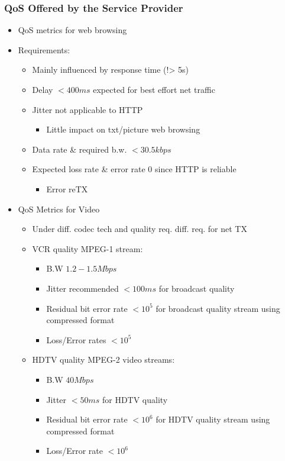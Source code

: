 \subsubsection{QoS Offered by the Service Provider}
\begin{itemize}
	\item QoS metrics for web browsing
	\item Requirements:
	\begin{itemize}
		\item Mainly influenced by response time (!> 5s)
		\item Delay $<400ms$ expected for best effort net traffic
		\item Jitter not applicable to HTTP
		\begin{itemize}
			\item Little impact on txt/picture web browsing
		\end{itemize}
		\item Data rate \& required b.w. $<30.5kbps$
		\item Expected loss rate \& error rate 0 since HTTP is
			reliable
		\begin{itemize}
			\item Error reTX
		\end{itemize}
	\end{itemize}
	\item QoS Metrics for Video
	\begin{itemize}
		\item Under diff. codec tech and quality req. diff. req. for net
			TX
		\item VCR quality MPEG-1 stream:
		\begin{itemize}
			\item B.W $1.2-1.5Mbps$
			\item Jitter recommended $<100ms$ for broadcast quality
			\item Residual bit error rate $<10^5$ for broadcast
				quality stream using compressed format
			\item Loss/Error rates $<10^5$
		\end{itemize}
		\item HDTV quality MPEG-2 video streams:
		\begin{itemize}
			\item B.W $40Mbps$
			\item Jitter $<50ms$ for HDTV quality
			\item Residual bit error rate $<10^6$ for HDTV quality
				stream using compressed format
			\item Loss/Error rate $<10^6$

\end{itemize}
\end{itemize}
\end{itemize}
